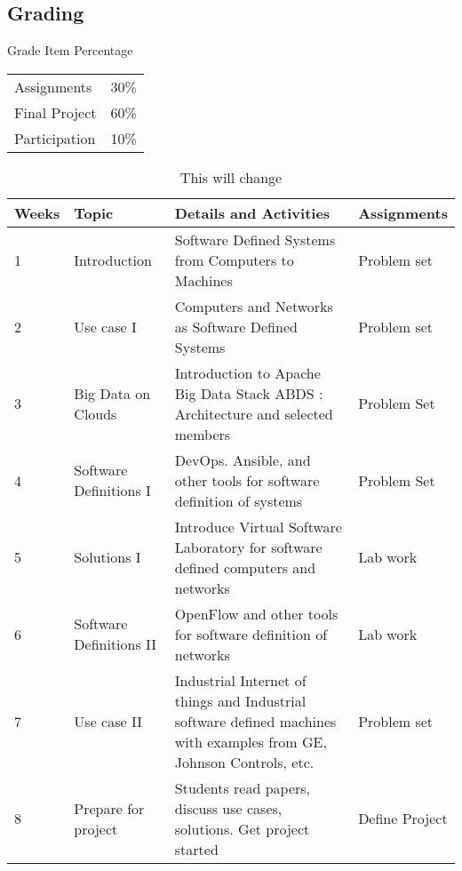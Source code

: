 \subsection{Grading}

Grade Item	Percentage

\begin{tabular}{lr}
Assignments	  & 30\% \\
Final Project	& 60\% \\
Participation	& 10\% \\
\end{tabular}


\begin{table}[h]
\centering
\caption{This will change}
\label{T:e621}
\begin{tabular}{p{1cm}p{4cm}p{6cm}p{2cm}}
Weeks & Topic                    & Details and Activities  & Assignments          \\
\hline
1     & Introduction             & Software Defined Systems from Computers to Machines                                                                  & Problem set          \\
2     & Use case I               & Computers and Networks as Software Defined Systems                                                                   & Problem set          \\
3     & Big Data on Clouds       & Introduction to Apache Big Data Stack ABDS : Architecture and selected members                                       & Problem Set          \\
4     & Software Definitions I   & DevOps. Ansible, and other tools for software definition of systems                                                  & Problem Set          \\
5     & Solutions I              & Introduce Virtual Software Laboratory for software defined computers and networks                                    & Lab work             \\
6     & Software Definitions II  & OpenFlow and other tools for software definition of networks                                                         & Lab work             \\
7     & Use case II              & Industrial Internet of things and Industrial software defined machines with examples from GE, Johnson Controls, etc. & Problem set          \\
8     & Prepare for project      & Students read papers, discuss use cases, solutions. Get project started                                              & Define Project       \\

\end{tabular}
\end{table}
